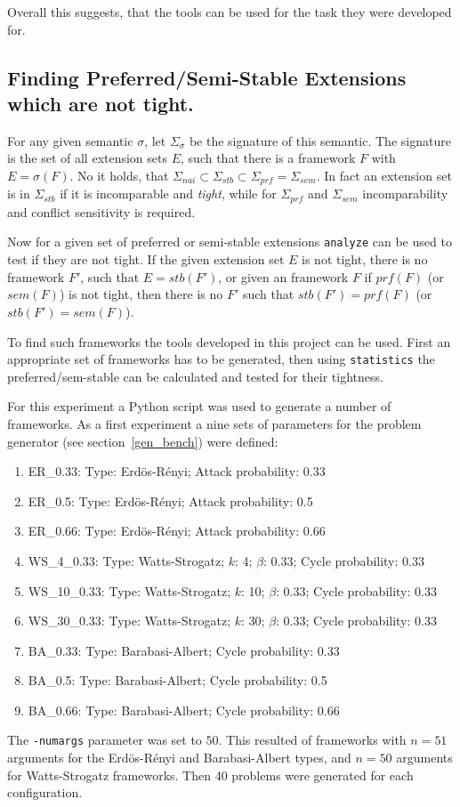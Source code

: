 \documentclass[parskip=half]{scrartcl}
\begin{document}
Overall this suggests, that the tools can be used for the task they were
developed for.

\subsection{Finding Preferred/Semi-Stable Extensions which are not tight.}

For any given semantic $\sigma$, let $\Sigma_{\sigma}$ be the signature of this
semantic. The signature is the set of all extension sets $E$, such that there is a
framework $F$ with $E=\sigma(F)$. No it holds, that $\Sigma_{nai}\subset
\Sigma_{stb}\subset\Sigma_{prf}=\Sigma_{sem}$. In fact an extension set is in $\Sigma_{stb}$
if it is incomparable and \emph{tight}, while for $\Sigma_{prf}$ and $\Sigma_{sem}$
incomparability and conflict sensitivity is required.

Now for a given set of preferred or semi-stable extensions \texttt{analyze} can be used
to test if they are not tight. If the given extension set $E$ is not tight, there is
no framework $F'$, such that $E=stb(F')$, or given an framework $F$ if $prf(F)$ (or $sem(F)$)
is not tight, then there is no $F'$ such that $stb(F')=prf(F)$ (or $stb(F')=sem(F)$).

To find such frameworks the tools developed in this project can be used. First an
appropriate set of frameworks has to be generated, then using \texttt{statistics} the
preferred/sem-stable can be calculated and tested for their tightness.

For this experiment a Python script was used to generate a number of frameworks.
As a first experiment a nine sets of parameters for the problem generator (see section~\ref{gen_bench})
were defined:
\begin{enumerate}
  \item ER\_0.33: Type: Erdös-Rényi; Attack probability: 0.33
  \item ER\_0.5: Type: Erdös-Rényi; Attack probability: 0.5
  \item ER\_0.66: Type: Erdös-Rényi; Attack probability: 0.66
  \item WS\_4\_0.33: Type: Watts-Strogatz; $k$: 4; $\beta$: 0.33; Cycle probability: 0.33
  \item WS\_10\_0.33: Type: Watts-Strogatz; $k$: 10; $\beta$: 0.33; Cycle probability: 0.33
  \item WS\_30\_0.33: Type: Watts-Strogatz; $k$: 30; $\beta$: 0.33; Cycle probability: 0.33
  \item BA\_0.33: Type: Barabasi-Albert; Cycle probability: 0.33
  \item BA\_0.5: Type: Barabasi-Albert; Cycle probability: 0.5
  \item BA\_0.66: Type: Barabasi-Albert; Cycle probability: 0.66
\end{enumerate}
The \texttt{-numargs} parameter was set to $50$. This resulted of frameworks with
$n=51$ arguments for the Erdös-Rényi and Barabasi-Albert types, and $n=50$ arguments for
Watts-Strogatz frameworks. Then 40 problems were generated for each configuration.
\end{document}
